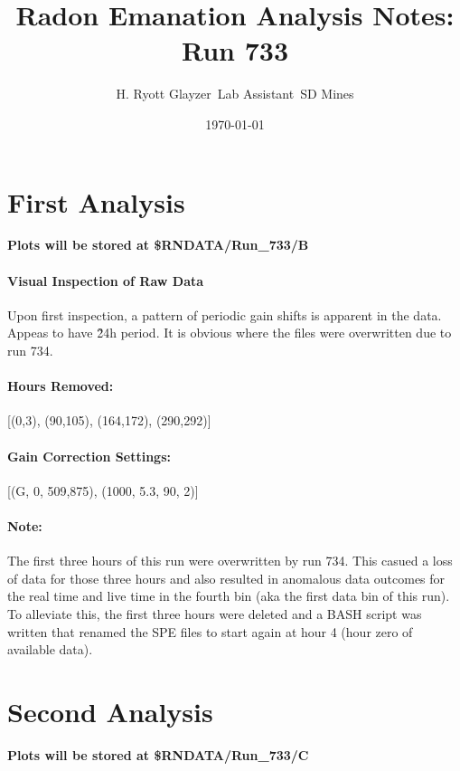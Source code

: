 \documentclass[letterpaper,12pt]{article}
\begin{document}
\title{Radon Emanation Analysis Notes: Run 733}
\author{H. Ryott Glayzer\ Lab Assistant\ SD Mines}
\date{\today}

\maketitle

\section*{First Analysis}

\textbf{Plots will be stored at \$RNDATA/Run\_733/B}

\paragraph{Visual Inspection of Raw Data}
Upon first inspection, a pattern of periodic gain shifts is apparent in the data.
Appeas to have \~24h period.
It is obvious where the files were overwritten due to run 734.

\paragraph{Hours Removed: }
[(0,3), (90,105), (164,172), (290,292)]

\paragraph{Gain Correction Settings: }
[(G, 0, 509,875), (1000, 5.3, 90, 2)]



\paragraph{Note:}
The first three hours of this run were overwritten by run 734. 
This casued a loss of data for those three hours and also resulted
in anomalous data outcomes for the real time and live time in the fourth bin
(aka the first data bin of this run).
To alleviate this, the first three hours were deleted and a BASH script was written
that renamed the SPE files to start again at hour 4 (hour zero of available data).




\section*{Second Analysis}

\textbf{Plots will be stored at \$RNDATA/Run\_733/C}
\end{document}
